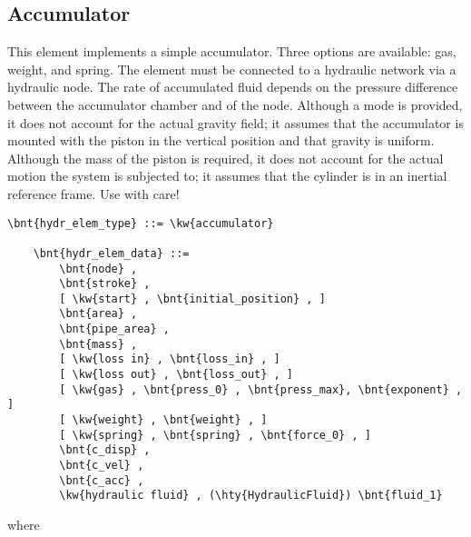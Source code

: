 \subsection{Accumulator}
\label{sec:EL:HYDR:ACCUMULATOR}
This element implements a simple accumulator.
Three options are available: gas, weight, and spring.
The element must be connected to a hydraulic network via a hydraulic node.
The rate of accumulated fluid depends on the pressure difference between the accumulator chamber and of the node.
Although a  mode is provided, it does not account for the actual gravity field;
it assumes that the accumulator is mounted with the piston in the vertical position and that gravity is uniform.
Although the mass of the piston is required, it does not account for the actual motion the system is subjected to;
it assumes that the cylinder is in an inertial reference frame.  Use with care!
\begin{Verbatim}[commandchars=\\\{\}]
    \bnt{hydr_elem_type} ::= \kw{accumulator}

    \bnt{hydr_elem_data} ::=
        \bnt{node} ,
        \bnt{stroke} ,
        [ \kw{start} , \bnt{initial_position} , ]
        \bnt{area} ,
        \bnt{pipe_area} ,
        \bnt{mass} ,
        [ \kw{loss in} , \bnt{loss_in} , ]
        [ \kw{loss out} , \bnt{loss_out} , ]
        [ \kw{gas} , \bnt{press_0} , \bnt{press_max}, \bnt{exponent} , ]
        [ \kw{weight} , \bnt{weight} , ]
        [ \kw{spring} , \bnt{spring} , \bnt{force_0} , ]
        \bnt{c_disp} ,
        \bnt{c_vel} ,
        \bnt{c_acc} , 
        \kw{hydraulic fluid} , (\hty{HydraulicFluid}) \bnt{fluid_1}
\end{Verbatim}
where
